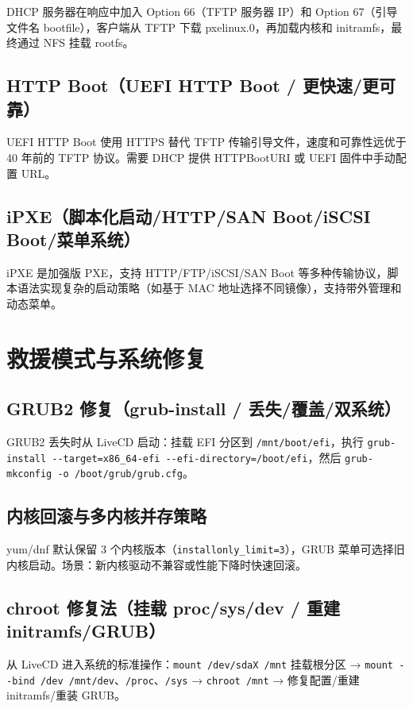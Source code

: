 \documentclass[12pt,UTF8]{ctexbook}
\begin{document}
DHCP 服务器在响应中加入 Option 66（TFTP 服务器 IP）和 Option 67（引导文件名 bootfile），客户端从 TFTP 下载 pxelinux.0，再加载内核和 initramfs，最终通过 NFS 挂载 rootfs。

    \subsection{HTTP Boot（UEFI HTTP Boot / 更快速/更可靠）}

UEFI HTTP Boot 使用 HTTPS 替代 TFTP 传输引导文件，速度和可靠性远优于 40 年前的 TFTP 协议。需要 DHCP 提供 HTTPBootURI 或 UEFI 固件中手动配置 URL。

    \subsection{iPXE（脚本化启动/HTTP/SAN Boot/iSCSI Boot/菜单系统）}

iPXE 是加强版 PXE，支持 HTTP/FTP/iSCSI/SAN Boot 等多种传输协议，脚本语法实现复杂的启动策略（如基于 MAC 地址选择不同镜像），支持带外管理和动态菜单。

  \section{救援模式与系统修复}
    \subsection{GRUB2 修复（grub-install / 丢失/覆盖/双系统）}

GRUB2 丢失时从 LiveCD 启动：挂载 EFI 分区到 \verb|/mnt/boot/efi|，执行 \verb|grub-install --target=x86_64-efi --efi-directory=/boot/efi|，然后 \verb|grub-mkconfig -o /boot/grub/grub.cfg|。

    \subsection{内核回滚与多内核并存策略}

yum/dnf 默认保留 3 个内核版本（\verb|installonly_limit=3|），GRUB 菜单可选择旧内核启动。场景：新内核驱动不兼容或性能下降时快速回滚。

    \subsection{chroot 修复法（挂载 proc/sys/dev / 重建 initramfs/GRUB）}

从 LiveCD 进入系统的标准操作：\verb|mount /dev/sdaX /mnt| 挂载根分区 → \verb|mount --bind /dev /mnt/dev|、\verb|/proc|、\verb|/sys| → \verb|chroot /mnt| → 修复配置/重建 initramfs/重装 GRUB。
\end{document}

